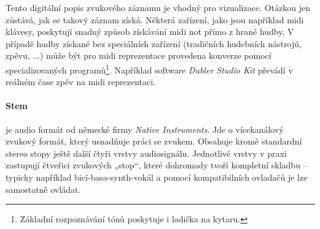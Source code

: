 \documentclass[thesis=B, czech]{FITthesis}[2019/03/06]
\begin{document}

Tento digitální popis zvukového záznamu je vhodný pro vizualizace. Otázkou jen zůstává, jak se takový záznam získá. Některá zařízení, jako jsou například \gls{midi} klávesy, poskytují snadný způsob získávání \gls{midi} not přímo z hrané hudby. V případě hudby získané bez speciálních zařízení (tradičních hudebních nástrojů, zpěvu, ...) může být pro \gls{midi} reprezentace provedena konverze pomocí specializovaných programů\footnote{Základní rozpoznávání tónů poskytuje i ladička na kytaru.}. Například software \textit{Dubler Studio Kit \cite{DublerStudioKit}} převádí v reálném čase zpěv na \gls{midi} reprezentaci.


\paragraph*{Stem}

je audio formát od německé firmy \textit{Native Instruments}. Jde o vícekanálový zvukový formát, který usnadňuje práci se zvukem. Obsahuje kromě standardní stereo stopy ještě další čtyři vrstvy audiosignálu. Jednotlivé vrstvy v praxi zastupují čtveřici zvukových „stop“, které dohromady tvoří kompletní skladbu – typicky například bicí-basa-synth-vokál a pomocí kompatibilních ovladačů je lze samostatně ovládat.







\end{document}
